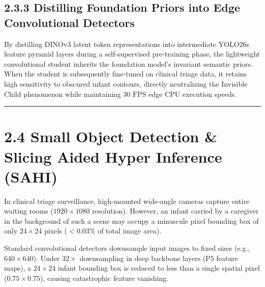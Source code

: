\subsection{2.3.3 Distilling Foundation Priors into Edge Convolutional
Detectors}\label{distilling-foundation-priors-into-edge-convolutional-detectors}

By distilling DINOv3 latent token representations into intermediate
YOLO26s feature pyramid layers during a self-supervised pre-training
phase, the lightweight convolutional student inherits the foundation
model's invariant semantic priors. When the student is subsequently
fine-tuned on clinical triage data, it retains high sensitivity to
obscured infant contours, directly neutralizing the Invisible Child
phenomenon while maintaining \(30\text{ FPS}\) edge CPU execution
speeds.

\begin{center}\rule{0.5\linewidth}{0.5pt}\end{center}

\section{2.4 Small Object Detection \& Slicing Aided Hyper Inference
(SAHI)}\label{small-object-detection-slicing-aided-hyper-inference-sahi}

In clinical triage surveillance, high-mounted wide-angle cameras capture
entire waiting rooms (\(1920\times 1080\) resolution). However, an
infant carried by a caregiver in the background of such a scene may
occupy a minuscule pixel bounding box of only \(24\times 24\) pixels
(\(<0.03\%\) of total image area).

Standard convolutional detectors downsample input images to fixed sizes
(e.g., \(640\times 640\)). Under \(32\times\) downsampling in deep
backbone layers (P5 feature maps), a \(24\times 24\) infant bounding box
is reduced to less than a single spatial pixel (\(0.75\times 0.75\)),
causing catastrophic feature vanishing.

